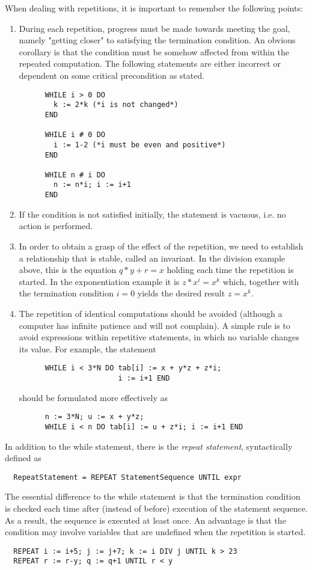When dealing with repetitions, it is important to remember the following points:
\begin{enumerate}
  \item During each repetition, progress must be made towards meeting the goal, namely "getting
    closer" to satisfying the termination condition. An obvious corollary is that the condition
    must be somehow affected from within the repeated computation. The following statements are
    either incorrect or dependent on some critical precondition as stated.
    \begin{verbatim}
      WHILE i > 0 DO
        k := 2*k (*i is not changed*)
      END
 
      WHILE i # 0 DO
        i := 1-2 (*i must be even and positive*)
      END
 
      WHILE n # i DO
        n := n*i; i := i+1
      END
    \end{verbatim}
  \item If the condition is not satisfied initially, the statement is vacuous, i.e. no action
    is performed.

  \item In order to obtain a grasp of the effect of the repetition, we need to establish a
    relationship that is stable, called an invariant. In the division example above, this is the
    equation $q*y + r = x$ holding each time the repetition is started. In the exponentiation
    example it is $z * x^i = x^k$ which, together with the termination condition $i = 0$ yields
    the desired result $z = x^k$.

  \item The repetition of identical computations should be avoided (although a computer has
    infinite patience and will not complain). A simple rule is to avoid expressions within
    repetitive statements, in which no variable changes its value. For example, the statement
    \begin{verbatim}
      WHILE i < 3*N DO tab[i] := x + y*z + z*i;
                       i := i+1 END
    \end{verbatim}
    should be formulated more effectively as
    \begin{verbatim}
      n := 3*N; u := x + y*z;
      WHILE i < n DO tab[i] := u + z*i; i := i+1 END
    \end{verbatim}
\end{enumerate}

In addition to the while statement, there is the \emph{repeat statement}, syntactically defined as
\begin{verbatim}
  RepeatStatement = REPEAT StatementSequence UNTIL expr
\end{verbatim}
The essential difference to the while statement is that the termination condition is checked each
time after (instead of before) execution of the statement sequence. As a result, the sequence is
executed at least once. An advantage is that the condition may involve variables that are undefined
when the repetition is started.
\begin{verbatim}
  REPEAT i := i+5; j := j+7; k := i DIV j UNTIL k > 23
  REPEAT r := r-y; q := q+1 UNTIL r < y
\end{verbatim}


